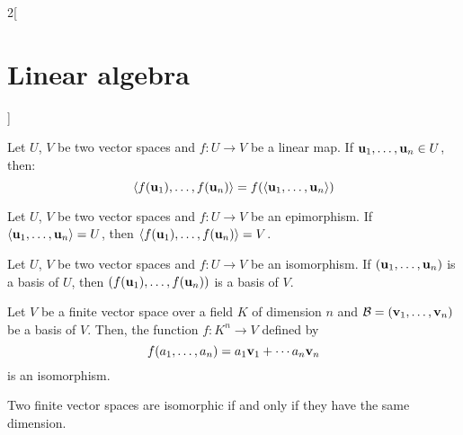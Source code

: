\documentclass[../../../main_math.tex]{subfiles}
\begin{document}
\begin{multicols}{2}[\section{Linear algebra}]
\begin{proposition}
  \end{proposition}
  \begin{lemma}
    Let $U$, $V$ be two vector spaces and $f:U\rightarrow V$ be a linear map. If $\boldsymbol{\mathrm{u}}_1,\ldots,\boldsymbol{\mathrm{u}}_n\in U$, then: $$\langle f(\boldsymbol{\mathrm{u}}_1),\ldots,f(\boldsymbol{\mathrm{u}}_n)\rangle=f(\langle\boldsymbol{\mathrm{u}}_1,\ldots,\boldsymbol{\mathrm{u}}_n\rangle)$$
  \end{lemma}
  \begin{corollary}
    Let $U$, $V$ be two vector spaces and $f:U\rightarrow V$ be an epimorphism. If $\langle\boldsymbol{\mathrm{u}}_1,\ldots,\boldsymbol{\mathrm{u}}_n\rangle= U$, then $\langle f(\boldsymbol{\mathrm{u}}_1),\ldots,f(\boldsymbol{\mathrm{u}}_n)\rangle=V$.
  \end{corollary}
  \begin{corollary}
    Let $U$, $V$ be two vector spaces and $f:U\rightarrow V$ be an isomorphism. If $(\boldsymbol{\mathrm{u}}_1,\ldots,\boldsymbol{\mathrm{u}}_n)$ is a basis of $U$, then $(f(\boldsymbol{\mathrm{u}}_1),\ldots,f(\boldsymbol{\mathrm{u}}_n))$ is a basis of $V$.
  \end{corollary}
  \begin{theorem}
    Let $V$ be a finite vector space over a field $K$ of dimension $n$ and $\mathcal{B}=(\boldsymbol{\mathrm{v}}_1,\ldots,\boldsymbol{\mathrm{v}}_n)$ be a basis of $V$. Then, the function $f:K^n\rightarrow V$ defined by $$f(a_1,\ldots,a_n)=a_1\boldsymbol{\mathrm{v}}_1+\cdots a_n\boldsymbol{\mathrm{v}}_n$$ is an isomorphism.
  \end{theorem}
  \begin{corollary}
    Two finite vector spaces are isomorphic if and only if they have the same dimension.
  \end{corollary}

\end{multicols}
\end{document}
